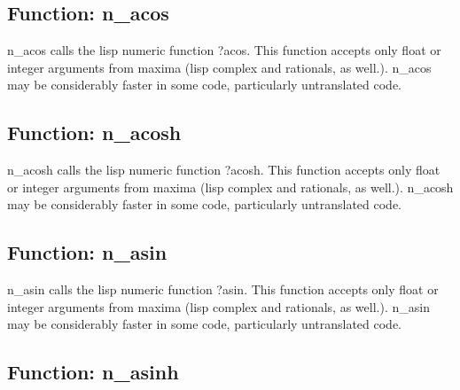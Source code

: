 \documentclass[]{article}
\begin{document}
\vspace{5 pt}


\subsection{Function: n\_acos\label{sec:n_acos}}
\hypertarget{n_acos}{}



\vspace{5 pt}
n\_acos calls the lisp numeric function ?acos. This function accepts only float or integer arguments from maxima (lisp complex and rationals, as well.). n\_acos may be considerably faster in some code, particularly untranslated code. 

\vspace{5 pt}


\subsection{Function: n\_acosh\label{sec:n_acosh}}
\hypertarget{n_acosh}{}



\vspace{5 pt}
n\_acosh calls the lisp numeric function ?acosh. This function accepts only float or integer arguments from maxima (lisp complex and rationals, as well.). n\_acosh may be considerably faster in some code, particularly untranslated code. 

\vspace{5 pt}


\subsection{Function: n\_asin\label{sec:n_asin}}
\hypertarget{n_asin}{}



\vspace{5 pt}
n\_asin calls the lisp numeric function ?asin. This function accepts only float or integer arguments from maxima (lisp complex and rationals, as well.). n\_asin may be considerably faster in some code, particularly untranslated code. 

\vspace{5 pt}


\subsection{Function: n\_asinh\label{sec:n_asinh}}
\hypertarget{n_asinh}{}
\end{document}
